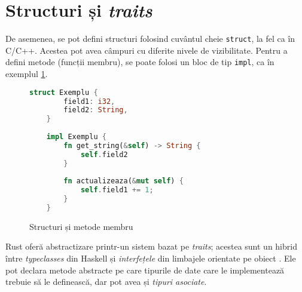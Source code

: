\section*{Structuri și \textit{traits}}

De asemenea, se pot defini structuri folosind cuvântul cheie \texttt{struct}, la fel ca în C/C++. Acestea pot avea câmpuri cu diferite nivele de vizibilitate. Pentru a defini metode (funcții membru), se poate folosi un bloc de tip \texttt{impl}, ca în exemplul \ref{fig:rust_structs}.

\begin{figure}[ht]
    \centering
    \begin{lstlisting}[language=Rust]
    struct Exemplu {
        field1: i32,
        field2: String,
    }
    
    impl Exemplu {
        fn get_string(&self) -> String {
            self.field2
        }
        
        fn actualizeaza(&mut self) {
            self.field1 += 1;
        }
    }
    \end{lstlisting}
    \caption{Structuri și metode membru}
    \label{fig:rust_structs}
\end{figure}

Rust oferă abstractizare printr-un sistem bazat pe \emph{traits}; acestea sunt un hibrid între \textit{typeclasses} din Haskell și \textit{interfețele} din limbajele orientate pe obiect \cite{traits_paper}. Ele pot declara metode abstracte pe care tipurile de date care le implementează trebuie să le definească, dar pot avea și \textit{tipuri asociate}.
